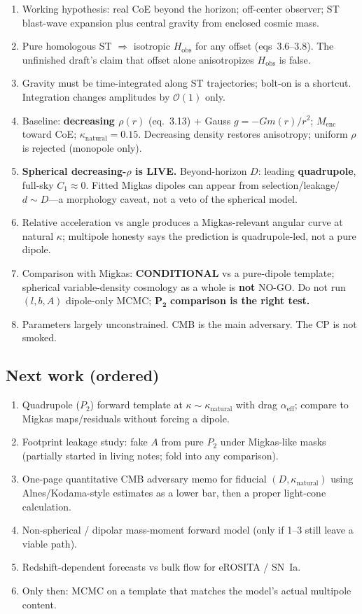 \documentclass[11pt,a4paper]{article}
\begin{document}
\begin{enumerate}
\item Working hypothesis: real CoE beyond the horizon; off-center observer; ST blast-wave expansion plus central gravity from enclosed cosmic mass.
\item Pure homologous ST \(\Rightarrow\) isotropic \(H_{\mathrm{obs}}\) for any offset (eqs~3.6--3.8). The unfinished draft's claim that offset alone anisotropizes \(H_{\mathrm{obs}}\) is false.
\item Gravity must be time-integrated along ST trajectories; bolt-on is a shortcut. Integration changes amplitudes by \(\mathcal{O}(1)\) only.
\item Baseline: \textbf{decreasing \(\rho(r)\)} (eq.~3.13) + Gauss \(g=-G m(r)/r^2\); \(M_{\mathrm{enc}}\) toward CoE; \(\kappa_{\mathrm{natural}}=0.15\). Decreasing density restores anisotropy; uniform \(\rho\) is rejected (monopole only).
\item \textbf{Spherical decreasing-\(\rho\) is LIVE.} Beyond-horizon \(D\): leading \textbf{quadrupole}, full-sky \(C_1\approx 0\). Fitted Migkas dipoles can appear from selection/leakage/\(d\sim D\)---a morphology caveat, not a veto of the spherical model.
\item Relative acceleration vs angle produces a Migkas-relevant angular curve at natural \(\kappa\); multipole honesty says the prediction is quadrupole-led, not a pure dipole.
\item Comparison with Migkas: \textbf{CONDITIONAL} vs a pure-dipole template; spherical variable-density cosmology as a whole is \textbf{not} NO-GO. Do not run \((l,b,A)\) dipole-only MCMC; \(\boldsymbol{P_2}\) \textbf{comparison is the right test.}
\item Parameters largely unconstrained. CMB is the main adversary. The CP is not smoked.
\end{enumerate}

\subsection{Next work (ordered)}

\begin{enumerate}
\item Quadrupole (\(P_2\)) forward template at \(\kappa\sim\kappa_{\mathrm{natural}}\) with drag \(\alpha_{\mathrm{eff}}\); compare to Migkas maps/residuals without forcing a dipole.
\item Footprint leakage study: fake \(A\) from pure \(P_2\) under Migkas-like masks (partially started in living notes; fold into any comparison).
\item One-page quantitative CMB adversary memo for fiducial \((D,\kappa_{\mathrm{natural}})\) using Alnes/Kodama-style estimates as a lower bar, then a proper light-cone calculation.
\item Non-spherical / dipolar mass-moment forward model (only if 1--3 still leave a viable path).
\item Redshift-dependent forecasts vs bulk flow for eROSITA / SN~Ia.
\item Only then: MCMC on a template that matches the model's actual multipole content.
\end{enumerate}
\end{document}
